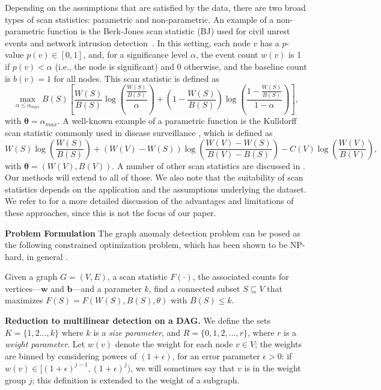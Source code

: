 Depending on the assumptions that are satisfied by the data, there are two broad types of scan statistics: parametric and non-parametric. 
An example of a non-parametric function is the Berk-Jones scan statistic (BJ) \cite{Berk-79} used for civil unrest events and network intrusion detection~\cite{chen2014non,mcfowland2013fast}. In this setting, each node $v$ has a $p$-value $p(v) \in [0,1]$, and, for a significance level $\alpha$, the event count $w(v)$ is 1 if $p(v) < \alpha$ (i.e., the node is significant) and 0 otherwise, and the baseline count is $b(v) = 1$ for all nodes. This scan statistic is defined as
{\scriptsize
$$
\max_{\alpha \leq \alpha_{max}}B(S) \left[\frac{W(S)}{B(S)} \log\left(\frac{\frac{W(S)}{B(S)}}{\alpha}\right) + \left(1 - \frac{W(S)}{B(S)}\right) \log\left(\frac{1 - \frac{W(S)}{B(S)}}{1 -\alpha}\right) \right],
$$}
with $\mathbf{\theta} = \alpha_{max}$.
A well-known example of a parametric function is the Kulldorff scan statistic commonly used in disease surveillance \cite{kulldorff_spatial_1997,Duczmal06,kulldorff2003power,neill-jss12}, which is defined as 
{\scriptsize $$
W(S) \log\left(\frac{W(S)}{B(S)}\right) + (W(V) - W(S)) \log\left(\frac{W(V) - W(S)}{B(V) - B(S)}\right) - C(V) \log\left(\frac{W(V)}{B(V)}\right),
$$}
with $\mathbf{\theta} = (W(V),B(V))$. 
A number of other scan statistics are discussed in \cite{cadena:sdm17}. Our methods will extend to
all of those. We also note that the suitability of scan statistics depends on the application and the assumptions
underlying the dataset. We refer to
\cite{margai2003community, neill-jss12, kulldorff_spatial_1997, neill2007nonparametric}
for a more detailed discussion of the advantages and limitations
of these approaches, since this is not the focus of our paper.

\noindent
\textbf{Problem Formulation} 
The graph anomaly detection problem can be posed as the following constrained optimization problem,
which has been shown to be NP-hard, in general \cite{cadena:sdm17}.

\begin{problem}
\label{prob:macs}
Given a graph $G=(V, E)$, a scan statistic $F(\cdot)$, the associated counts for vertices---$\mathbf{w}$ and $\mathbf{b}$---and a parameter $k$, find a connected subset $S\subseteq V$ that maximizes $F(S) = F(W(S), B(S), \theta)$ with $B(S) \leq k$.
\end{problem}

\noindent
\textbf{Reduction to multilinear detection on a DAG.}
We define the sets $K=\{1,2 \ldots, k\}$ where $k$ is a \emph{size parameter}, 
and $R=\{0,1,2,\ldots, r\}$, where $r$ is a \emph{weight parameter}. Let $w(v)$ denote the
weight for each node $v\in V$; the weights are binned by considering powers of $(1+\epsilon)$, for an error parameter $\epsilon>0$: if $w(v)\in [(1+ \epsilon)^{j-1}, (1+ \epsilon)^{j})$, we will sometimes say that $v$ is
in the weight group $j$; this definition is extended to the weight of a subgraph.

